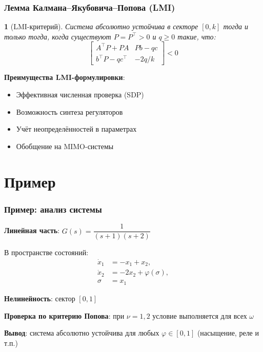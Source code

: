\documentclass[14pt,aspectratio=169]{beamer}
\theoremstyle{definition}
\theoremstyle{plain}
\newtheorem*{theorem}{}
\begin{document}
\begin{frame}
\frametitle{Лемма Калмана--Якубовича--Попова (LMI)}
\begin{theorem}[LMI-критерий]
Система абсолютно устойчива в секторе $[0, k]$ тогда и только тогда, когда существуют $P=P^\top>0$ и $q\ge 0$ такие, что:
\begin{equation*}
    \begin{bmatrix}
        A^\top P + P A & P b - q c\\
        b^\top P - q c^\top & -2q/k
    \end{bmatrix} < 0
\end{equation*}
\end{theorem}

\vspace{8pt}
\textbf{Преимущества LMI-формулировки}:
\begin{itemize}
    \item Эффективная численная проверка (SDP)
    \item Возможность синтеза регуляторов
    \item Учёт неопределённостей в параметрах
    \item Обобщение на MIMO-системы
\end{itemize}
\end{frame}

\section{Пример}

\begin{frame}
\frametitle{Пример: анализ системы}
\textbf{Линейная часть}: $G(s) = \dfrac{1}{(s+1)(s+2)}$

\vspace{10pt}
В пространстве состояний:
\begin{equation*}
    \begin{aligned}
        \dot x_1 &= -x_1 + x_2,\\
        \dot x_2 &= -2x_2 + \varphi(\sigma),\\
        \sigma &= x_1
    \end{aligned}
\end{equation*}

\vspace{10pt}
\textbf{Нелинейность}: сектор $[0, 1]$

\vspace{10pt}
\textbf{Проверка по критерию Попова}: при $\nu = 1{,}2$ условие выполняется для всех $\omega$

\vspace{10pt}
\textbf{Вывод}: система абсолютно устойчива для любых $\varphi\in[0,1]$ (насыщение, реле и т.п.)
\end{frame}
\end{document}
